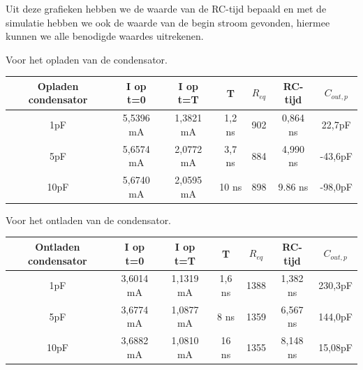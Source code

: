 \documentclass{article}
\begin{document}
Uit deze grafieken hebben we de waarde van de RC-tijd bepaald en met de simulatie hebben we ook de waarde van de begin stroom gevonden, hiermee kunnen we alle benodigde waardes uitrekenen.




\begin{center}

Voor het opladen van de condensator.

\begin{tabular}{|c |c |c | c| c|c |c|}
	\hline
Opladen condensator	& I op t=0	& I op t=T 	&  T 		& $R_{eq}$		&RC-tijd 	& $C_{out,p}$ \\
	\hline
1pF 				& 5,5396 mA	& 1,3821 mA	& 1,2 ns	& 902\Omega	& 0,864 ns	& 22,7pF \\
	\hline
5pF				& 5,6574 mA	& 2,0772 mA	&3,7 ns	& 884\Omega	& 4,990 ns	& -43,6pF  \\
	\hline
10pF				&5,6740 mA	& 2,0595 mA	& 10 ns	& 898\Omega	& 9.86 ns	& -98,0pF \\
	\hline
\end{tabular}
\newline

Voor het ontladen van de condensator.

\begin{tabular}{|c |c |c | c| c|c |c|}
	\hline
Ontladen condensator	& I op t=0	& I op t=T 	&  T 		& $R_{eq}$		&RC-tijd 	& $C_{out,p}$ \\
	\hline
1pF 				& 3,6014 mA	& 1,1319 mA	& 1,6 ns	& 1388\Omega	& 1,382 ns	& 230,3pF \\
	\hline
5pF				& 3,6774 mA	& 1,0877 mA	& 8 ns 	& 1359\Omega	& 6,567 ns	& 144,0pF  \\
	\hline
10pF				& 3,6882 mA	& 1,0810 mA	& 16 ns	& 1355\Omega	& 8,148 ns	& 15,08pF \\
	\hline

\end{tabular}
\end{center}
\end{document}
